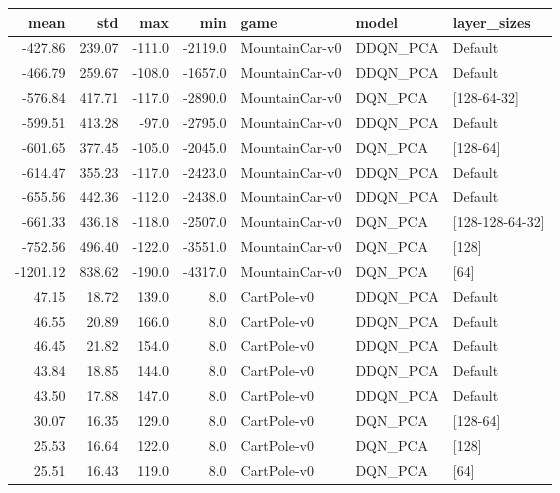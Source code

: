 \begin{tabular}{rrrrlll}
\toprule
    mean &     std &    max &     min &            game &     model &         layer\_sizes \\
\midrule
 -427.86 &  239.07 & -111.0 & -2119.0 &  MountainCar-v0 &  DDQN\_PCA &             Default \\
 -466.79 &  259.67 & -108.0 & -1657.0 &  MountainCar-v0 &  DDQN\_PCA &             Default \\
 -576.84 &  417.71 & -117.0 & -2890.0 &  MountainCar-v0 &   DQN\_PCA &       [128-64-32] \\
 -599.51 &  413.28 &  -97.0 & -2795.0 &  MountainCar-v0 &  DDQN\_PCA &             Default \\
 -601.65 &  377.45 & -105.0 & -2045.0 &  MountainCar-v0 &   DQN\_PCA &           [128-64] \\
 -614.47 &  355.23 & -117.0 & -2423.0 &  MountainCar-v0 &  DDQN\_PCA &             Default \\
 -655.56 &  442.36 & -112.0 & -2438.0 &  MountainCar-v0 &  DDQN\_PCA &             Default \\
 -661.33 &  436.18 & -118.0 & -2507.0 &  MountainCar-v0 &   DQN\_PCA &  [128-128-64-32] \\
 -752.56 &  496.40 & -122.0 & -3551.0 &  MountainCar-v0 &   DQN\_PCA &               [128] \\
-1201.12 &  838.62 & -190.0 & -4317.0 &  MountainCar-v0 &   DQN\_PCA &                [64] \\
   47.15 &   18.72 &  139.0 &     8.0 &     CartPole-v0 &  DDQN\_PCA &             Default \\
   46.55 &   20.89 &  166.0 &     8.0 &     CartPole-v0 &  DDQN\_PCA &             Default \\
   46.45 &   21.82 &  154.0 &     8.0 &     CartPole-v0 &  DDQN\_PCA &             Default \\
   43.84 &   18.85 &  144.0 &     8.0 &     CartPole-v0 &  DDQN\_PCA &             Default \\
   43.50 &   17.88 &  147.0 &     8.0 &     CartPole-v0 &  DDQN\_PCA &             Default \\
   30.07 &   16.35 &  129.0 &     8.0 &     CartPole-v0 &   DQN\_PCA &           [128-64] \\
   25.53 &   16.64 &  122.0 &     8.0 &     CartPole-v0 &   DQN\_PCA &               [128] \\
   25.51 &   16.43 &  119.0 &     8.0 &     CartPole-v0 &   DQN\_PCA &                [64] \\

\end{tabular}
